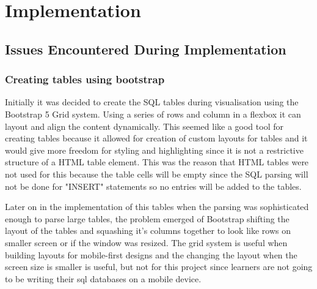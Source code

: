 \chapter{Implementation}

\section{Issues Encountered During Implementation}

\subsection{Creating tables using bootstrap}

Initially it was decided to create the SQL tables during visualisation using the Bootstrap 5 Grid system. Using a series of rows and column in a flexbox it can layout and align the content dynamically. This seemed like a good tool for creating tables because it allowed for creation of custom layouts for tables and it would give more freedom for styling and highlighting since it is not a restrictive structure of a HTML table element. This was the reason that HTML tables were not used for this because the table cells will be empty since the SQL parsing will not be done for "INSERT" statements so no entries will be added to the tables.

Later on in the implementation of this tables when the parsing was sophisticated enough to parse large tables, the problem emerged of Bootstrap shifting the layout of the tables and squashing it's columns together to look like rows on smaller screen or if the window was resized. The grid system is useful when building layouts for mobile-first designs and the changing the layout when the screen size is smaller is useful, but not for this project since learners are not going to be writing their sql databases on a mobile device. 

